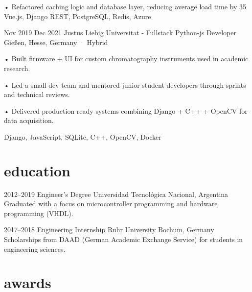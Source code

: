 \documentclass[a4paper,nocolors]{friggeri-cv}
\begin{document}
\begin{entrylist}
{• Refactored caching logic and database layer, reducing average load time by 35%
}
{Vue.js, Django REST, PostgreSQL, Redis, Azure}

\entryexperience
{Nov 2019}
{Dec 2021}
{Justus Liebig Universitat - Fullstack Python-js Developer}
{Gießen, Hesse, Germany · Hybrid}
{
• Built firmware + UI for custom chromatography instruments used in academic research.

• Led a small dev team and mentored junior student developers through sprints and technical reviews.

• Delivered production-ready systems combining Django + C++ + OpenCV for data acquisition.
}
{Django, JavaScript, SQLite, C++, OpenCV, Docker}

\end{entrylist}

\vspace{-1em}
\section{education}

\begin{entrylist}


\entry
{2012--2019}
{Engineer’s Degree}
{Universidad Tecnológica Nacional, Argentina}
{Graduated with a focus on microcontroller programming and hardware programming (VHDL).}


\entry
{2017--2018}
{Engineering Internship}
{Ruhr University Bochum, Germany}
{Scholarships from DAAD (German Academic Exchange Service) for students in engineering sciences.}

\end{entrylist}

\vspace{-1em}
\section{awards}
\end{document}
